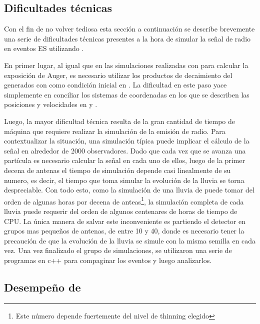 		
		\subsection{Dificultades técnicas}

		Con el fin de no volver tediosa esta sección a continuaci\'on se describe brevemente una serie de dificultades técnicas presentes a la hora de simular la señal de radio en eventos ES utilizando \zhs{}.

		En primer lugar, al igual que en las simulaciones realizadas con \aires{} para calcular la exposici\'on de Auger, es necesario utilizar los productos de decaimiento del \tauon{} generados con \tauola{} como condici\'on inicial en \zhs{}.
		La dificultad en este paso yace simplemente en conciliar los sistemas de coordenadas en los que se describen las posiciones y velocidades en \tauola{} y \zhs{}.

		Luego, la mayor dificultad técnica resulta de la gran cantidad de tiempo de máquina que requiere realizar la simulación de la emisión de radio.
		Para contextualizar la situación, una simulación típica puede implicar el c\'alculo de la señal en alrededor de 2000 observadores.
		Dado que cada vez que se avanza una partícula es necesario calcular la señal en cada uno de ellos, luego de la primer decena de antenas el tiempo de simulación depende casi linealmente de su numero, es decir, el tiempo que toma simular la evolución de la lluvia se torna despreciable.
		Con todo esto, como la simulación de una lluvia de  puede tomar del orden de algunas horas por decena de anteas\footnote{Este número depende fuertemente del nivel de thinning elegido}, la simulación completa de cada lluvia puede requerir del orden de algunos centenares de horas de tiempo de CPU.
		La única manera de salvar este inconveniente es partiendo el detector en grupos mas pequeños de antenas, de entre 10 y 40, donde es necesario tener la precaución de que la evolución de la lluvia se simule con la misma semilla en cada vez.
		Una vez finalizado el grupo de simulaciones, se utilizaron una serie de programas en c++ para compaginar los eventos y luego analizarlos.
		
		\subsection{Desempe\~no de \zhs{}}
		
